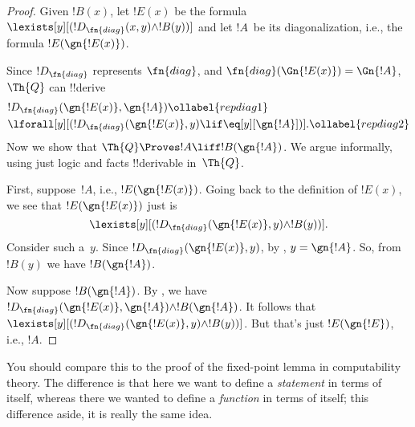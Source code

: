 \documentclass[../../../include/open-logic-section]{subfiles}
\begin{document}
\begin{proof}
Given $!B(x)$, let $!E(x)$ be the formula
$\lexists[y][(!D_{\fn{diag}}(x,y) \land !B(y))]$ and let $!A$~be its
diagonalization, i.e., the formula $!E(\gn{!E(x)})$.

Since $!D_{\fn{diag}}$ represents $\fn{diag}$, and
$\fn{diag}(\Gn{!E(x)}) = \Gn{!A}$, $\Th{Q}$ can !!{derive}
\begin{align}
  & !D_{\fn{diag}}(\gn{!E(x)}, \gn{!A}) \ollabel{repdiag1} \\
  & \lforall[y][(!D_{\fn{diag}}(\gn{!E(x)},y) \lif
  \eq[y][\gn{!A}])]. \ollabel{repdiag2}
\end{align}
Now we show that $\Th{Q} \Proves !A \liff !B(\gn{!A})$. We argue
informally, using just logic and facts !!{derivable} in~$\Th{Q}$.

First, suppose~$!A$, i.e., $!E(\gn{!E(x)})$. Going back to the
definition of $!E(x)$, we see that $!E(\gn{!E(x)})$ just is
\[
\lexists[y][(!D_{\fn{diag}}(\gn{!E(x)},y) \land !B(y))].
\]
Consider such a~$y$. Since $!D_{\fn{diag}}(\gn{!E(x)},y)$, by
, $y = \gn{!A}$. So, from $!B(y)$ we have
$!B(\gn{!A})$.

Now suppose $!B(\gn{!A})$. By , we have
$!D_{\fn{diag}}(\gn{!E(x)}, \gn{!A}) \land !B(\gn{!A})$. It follows
that $\lexists[y][(!D_{\fn{diag}}(\gn{!E(x)},y) \land !B(y))]$. But
that's just $!E(\gn{!E})$, i.e., $!A$.
\end{proof}

\begin{digress}
You should compare this to the proof of the fixed-point lemma in
computability theory. The difference is that here we want to define a
\emph{statement} in terms of itself, whereas there we wanted to define
a \emph{function} in terms of itself; this difference aside, it is
really the same idea.
\end{digress}
\end{document}
